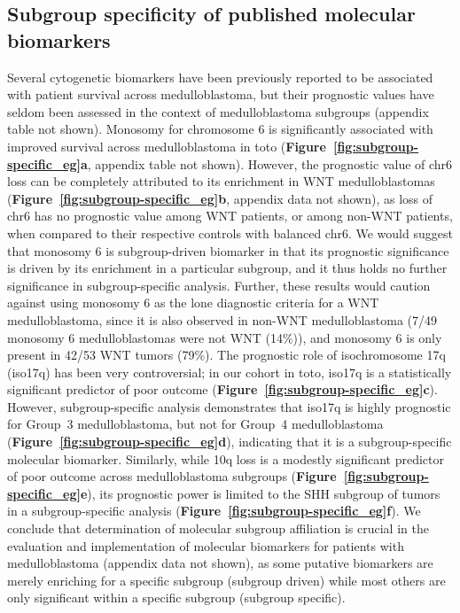 \documentclass[11pt,letterpaper]{article}
\theoremstyle{definition}
\newcommand{\citefig}[1]{\textbf{Figure~\ref{fig:#1}}}
\begin{document}
\subsection{Subgroup specificity of published molecular biomarkers}

Several cytogenetic biomarkers have been previously reported to be associated with patient survival across medulloblastoma, but their prognostic values have seldom been assessed in the context of medulloblastoma subgroups (appendix table not shown). Monosomy for chromosome 6 is significantly associated with improved survival across medulloblastoma in toto (\citefig{subgroup-specific_eg}\textbf{a}, appendix table not shown). However, the prognostic value of chr6 loss can be completely attributed to its enrichment in WNT medulloblastomas (\citefig{subgroup-specific_eg}\textbf{b}, appendix data not shown), as loss of chr6 has no prognostic value among WNT patients, or among non-WNT patients, when compared to their respective controls with balanced chr6.  We would suggest that monosomy 6 is subgroup-driven biomarker in that its prognostic significance is driven by its enrichment in a particular subgroup, and it thus holds no further significance in subgroup-specific analysis.  Further, these results would caution against using monosomy 6 as the lone diagnostic criteria for a WNT medulloblastoma, since it is also observed in non-WNT medulloblastoma (7/49 monosomy 6 medulloblastomas were not WNT (14\%)), and monosomy 6 is only present in 42/53 WNT tumors (79\%).  The prognostic role of isochromosome 17q (iso17q) has been very controversial; in our cohort in toto, iso17q is a statistically significant predictor of poor outcome (\citefig{subgroup-specific_eg}\textbf{c}).  However, subgroup-specific analysis demonstrates that iso17q is highly prognostic for Group~3 medulloblastoma, but not for Group~4 medulloblastoma (\citefig{subgroup-specific_eg}\textbf{d}), indicating that it is a subgroup-specific molecular biomarker.  Similarly, while 10q loss is a modestly significant predictor of poor outcome across medulloblastoma subgroups (\citefig{subgroup-specific_eg}\textbf{e}), its prognostic power is limited to the SHH subgroup of tumors in a subgroup-specific analysis (\citefig{subgroup-specific_eg}\textbf{f}).  We conclude that determination of molecular subgroup affiliation is crucial in the evaluation and implementation of molecular biomarkers for patients with medulloblastoma (appendix data not shown), as some putative biomarkers are merely enriching for a specific subgroup (subgroup driven) while most others are only significant within a specific subgroup (subgroup specific).
\end{document}
